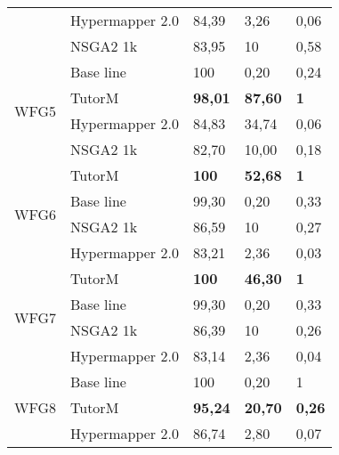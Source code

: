\begin{table}[]
{\begin{tabular}{@{}lllll@{}}
                          & Hypermapper 2.0 & 84,39          & 3,26           & 0,06          \\ \cmidrule(l){2-5} 
                          & NSGA2 1k        & 83,95          & 10             & 0,58          \\ \midrule
    \multirow{4}{*}{WFG5} & Base line       & 100            & 0,20           & 0,24          \\ \cmidrule(l){2-5} 
                          & TutorM          & \textbf{98,01} & \textbf{87,60} & \textbf{1}    \\ \cmidrule(l){2-5} 
                          & Hypermapper 2.0 & 84,83          & 34,74          & 0,06          \\ \cmidrule(l){2-5} 
                          & NSGA2 1k        & 82,70          & 10,00          & 0,18          \\ \midrule
    \multirow{4}{*}{WFG6} & TutorM          & \textbf{100}   & \textbf{52,68} & \textbf{1}    \\ \cmidrule(l){2-5} 
                          & Base line       & 99,30          & 0,20           & 0,33          \\ \cmidrule(l){2-5} 
                          & NSGA2 1k        & 86,59          & 10             & 0,27          \\ \cmidrule(l){2-5} 
                          & Hypermapper 2.0 & 83,21          & 2,36           & 0,03          \\ \midrule
    \multirow{4}{*}{WFG7} & TutorM          & \textbf{100}   & \textbf{46,30} & \textbf{1}    \\ \cmidrule(l){2-5} 
                          & Base line       & 99,30          & 0,20           & 0,33          \\ \cmidrule(l){2-5} 
                          & NSGA2 1k        & 86,39          & 10             & 0,26          \\ \cmidrule(l){2-5} 
                          & Hypermapper 2.0 & 83,14          & 2,36           & 0,04          \\ \midrule
    \multirow{4}{*}{WFG8} & Base line       & 100            & 0,20           & 1             \\ \cmidrule(l){2-5} 
                          & TutorM          & \textbf{95,24} & \textbf{20,70} & \textbf{0,26} \\ \cmidrule(l){2-5} 
                          & Hypermapper 2.0 & 86,74          & 2,80           & 0,07          \\ \cmidrule(l){2-5} 

\end{tabular}}
\end{table}
